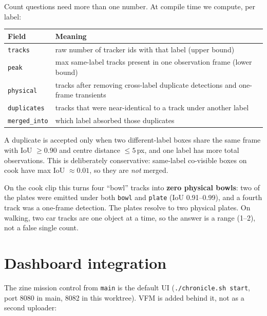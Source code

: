 \documentclass[10pt,a4paper]{article}
\newcommand{\code}[1]{\texttt{\small #1}}
\begin{document}
Count questions need more than one number. At compile time we compute, per label:

\begin{center}
\small
\begin{tabularx}{\linewidth}{@{}l X@{}}
\toprule
\textbf{Field} & \textbf{Meaning} \\
\midrule
\code{tracks} & raw number of tracker ids with that label (upper bound) \\
\code{peak} & max same-label tracks present in one observation frame (lower bound) \\
\code{physical} & tracks after removing cross-label duplicate detections and one-frame transients \\
\code{duplicates} & tracks that were near-identical to a track under another label \\
\code{merged\_into} & which label absorbed those duplicates \\
\bottomrule
\end{tabularx}
\end{center}

\noindent
A duplicate is accepted only when two different-label boxes share the same frame with IoU
$\ge 0.90$ and centre distance $\le 5$\,px, and one label has more total observations. This is
deliberately conservative: same-label co-visible boxes on cook have max IoU $\approx 0.01$, so
they are \emph{not} merged.

On the cook clip this turns four ``bowl'' tracks into \textbf{zero physical bowls}: two of the
plates were emitted under both \code{bowl} and \code{plate} (IoU 0.91--0.99), and a fourth track was
a one-frame detection. The plates resolve to two physical plates. On walking, two car tracks are
one object at a time, so the answer is a range (1--2), not a false single count.

\section{Dashboard integration}

The zine mission control from \code{main} is the default UI (\code{./chronicle.sh start}, port
8080 in main, 8082 in this worktree). VFM is added behind it, not as a second uploader:
\end{document}
